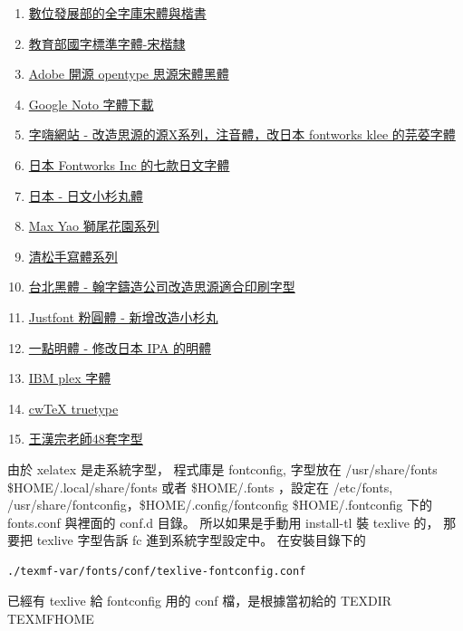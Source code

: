 \begin{enumerate}
  \item \href{https://data.gov.tw/dataset/5961}
    {數位發展部的全字庫宋體與楷書}
  \item \href{https://language.moe.gov.tw/result.aspx?classify_sn=23&subclassify_sn=436}
    {教育部國字標準字體-宋楷隸}
  \item \href{https://source.typekit.com/source-han-serif}
    {Adobe 開源 opentype 思源宋體黑體}
  \item \href{https://fonts.google.com/}
    {Google Noto 字體下載}
  \item \href{https://zi-hi.com/}
      {字嗨網站 - 改造思源的源X系列，注音體，改日本 fontworks klee 的芫荽字體}
  \item \href{https://github.com/fontworks-fonts}
    {日本 Fontworks Inc 的七款日文字體}
  \item \href{https://github.com/googlefonts/kosugi-maru}
    {日本 - 日文小杉丸體}
  \item \href{https://github.com/max32002?tab=repositories}
    {Max Yao 獅尾花園系列}
  \item \href{https://github.com/jasonhandwriting/JasonHandwriting}
    {清松手寫體系列}
  \item \href{https://sites.google.com/view/jtfoundry/zh-tw}
    {台北黑體 - 翰字鑄造公司改造思源適合印刷字型}
  \item \href{https://github.com/justfont/open-huninn-font}
    {Justfont 粉圓體 - 新增改造小杉丸}
  \item \href{https://github.com/ichitenfont/I.Ming}
    {一點明體 - 修改日本 IPA 的明體}
  \item \href{https://github.com/IBM/plex/releases}
    {IBM plex 字體}
  \item \href{https://github.com/l10n-tw/cwtex-q-fonts}
    {cwTeX truetype}
  \item \href{https://code.google.com/archive/p/wangfonts/}
    {王漢宗老師48套字型}
\end{enumerate}
由於 xelatex 是走系統字型， 程式庫是 fontconfig, 字型放在 /usr/share/fonts
\$HOME/.local/share/fonts 或者 \$HOME/.fonts ，設定在 /etc/fonts,
/usr/share/fontconfig，\$HOME/.config/fontconfig \$HOME/.fontconfig 下的
fonts.conf 與裡面的 conf.d 目錄。 所以如果是手動用 install-tl 裝 texlive 的，
那要把 texlive 字型告訴 fc 進到系統字型設定中。 在安裝目錄下的
\begin{verbatim}
./texmf-var/fonts/conf/texlive-fontconfig.conf
\end{verbatim}
已經有 texlive 給 fontconfig 用的 conf 檔，是根據當初給的 TEXDIR TEXMFHOME
